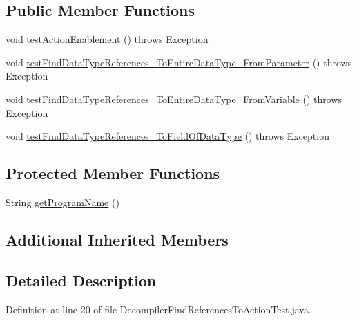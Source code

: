 \subsection*{Public Member Functions}
\begin{DoxyCompactItemize}
\item 
void \mbox{\hyperlink{classghidra_1_1app_1_1plugin_1_1core_1_1decompile_1_1_decompiler_find_references_to_action_test_a5bc700e25fe553a7fa90b649eb628364}{test\+Action\+Enablement}} ()  throws Exception 
\item 
void \mbox{\hyperlink{classghidra_1_1app_1_1plugin_1_1core_1_1decompile_1_1_decompiler_find_references_to_action_test_abcbf2eac0b6b0916b549a6cd1b487dc0}{test\+Find\+Data\+Type\+References\+\_\+\+To\+Entire\+Data\+Type\+\_\+\+From\+Parameter}} ()  throws Exception 
\item 
void \mbox{\hyperlink{classghidra_1_1app_1_1plugin_1_1core_1_1decompile_1_1_decompiler_find_references_to_action_test_a242ce02c89f1f674a753ca16a1977111}{test\+Find\+Data\+Type\+References\+\_\+\+To\+Entire\+Data\+Type\+\_\+\+From\+Variable}} ()  throws Exception 
\item 
void \mbox{\hyperlink{classghidra_1_1app_1_1plugin_1_1core_1_1decompile_1_1_decompiler_find_references_to_action_test_a303f1a21bc0949e92a7b9793d7a56a73}{test\+Find\+Data\+Type\+References\+\_\+\+To\+Field\+Of\+Data\+Type}} ()  throws Exception 
\end{DoxyCompactItemize}
\subsection*{Protected Member Functions}
\begin{DoxyCompactItemize}
\item 
String \mbox{\hyperlink{classghidra_1_1app_1_1plugin_1_1core_1_1decompile_1_1_decompiler_find_references_to_action_test_ac9b0b9cda951c9b71a0a684cd9cda073}{get\+Program\+Name}} ()
\end{DoxyCompactItemize}
\subsection*{Additional Inherited Members}


\subsection{Detailed Description}


Definition at line 20 of file Decompiler\+Find\+References\+To\+Action\+Test.\+java.



